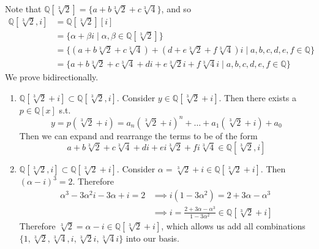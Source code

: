   \begin{solution}[Shifrin 3.2.2.c]
    Note that $\mathbb{Q}[\sqrt[3]{2}] = \{a + b \sqrt[3]{2} + c \sqrt[3]{4}\}$, and so 
    \begin{align}
      \mathbb{Q}[\sqrt[3]{2}, i] & = \mathbb{Q}[\sqrt[3]{2}][i] \\
                                 & = \{\alpha + \beta i \mid \alpha, \beta \in \mathbb{Q}[\sqrt[3]{2}]\} \\
                                 & = \{ (a + b \sqrt[3]{2} + c \sqrt[3]{4}) + (d + e \sqrt[3]{2} + f \sqrt[3]{4}) i \mid a, b, c, d, e, f \in \mathbb{Q}\} \\
                                 & = \{ a + b \sqrt[3]{2} + c \sqrt[3]{4} + d i + e \sqrt[3]{2} i + f \sqrt[3]{4} i \mid a, b, c, d, e, f \in \mathbb{Q}\}
    \end{align}
    We prove bidirectionally. 
    \begin{enumerate}
      \item $\mathbb{Q}[\sqrt[3]{2} + i] \subset \mathbb{Q}[\sqrt[3]{2}, i]$. Consider $y \in \mathbb{Q}[\sqrt[3]{2} + i]$. Then there exists a $p \in \mathbb{Q}[x]$ s.t. 
      \begin{equation}
        y = p(\sqrt[3]{2} + i) = a_n (\sqrt[3]{2} + i)^n + \ldots + a_1 (\sqrt[3]{2} + i) + a_0
      \end{equation}
      Then we can expand and rearrange the terms to be of the form 
      \begin{equation}
        a + b \sqrt[3]{2} + c \sqrt[3]{4} + d i + e i \sqrt[3]{2} + f i \sqrt[3]{4} \in \mathbb{Q}[\sqrt[3]{2}, i]
      \end{equation}

      \item $\mathbb{Q}[\sqrt[3]{2}, i] \subset \mathbb{Q}[\sqrt[3]{2} + i]$. Consider $\alpha = \sqrt[3]{2} + i \in \mathbb{Q}[\sqrt[3]{2} + i]$. Then $(\alpha - i)^3 = 2$. Therefore 
      \begin{align}
        \alpha^3 - 3 \alpha^2 i - 3 \alpha + i = 2 & \implies i(1 - 3 \alpha^2) = 2 + 3 \alpha - \alpha^3 \\ 
                                                   & \implies i = \frac{2 + 3 \alpha - \alpha^3}{1 - 3 \alpha^2} \in \mathbb{Q}[\sqrt[3]{2} + i]
      \end{align}
      Therefore $\sqrt[3]{2} = \alpha - i \in \mathbb{Q}[\sqrt[3]{2} + i]$, which allows us add all combinations $\{1, \sqrt[3]{2}, \sqrt[3]{4}, i, \sqrt[3]{2} i, \sqrt[3]{4} i\}$ into our basis. 
    \end{enumerate}
  \end{solution}

